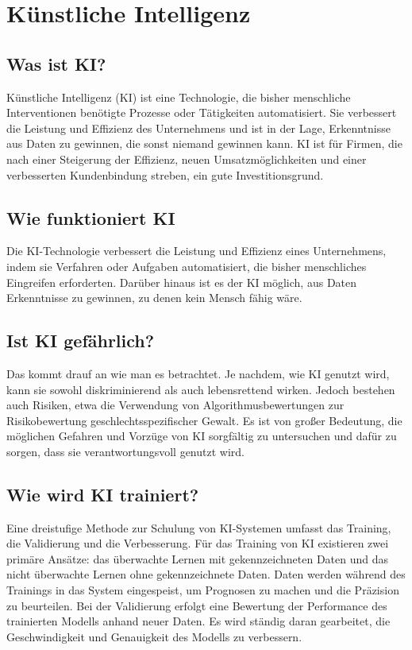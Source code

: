
\newpage
\chapter{Künstliche Intelligenz}
\section{Was ist KI?}
Künstliche Intelligenz (KI) ist eine Technologie, die bisher menschliche 
Interventionen benötigte Prozesse oder Tätigkeiten automatisiert. 
Sie verbessert die Leistung und Effizienz des Unternehmens und ist in der Lage, 
Erkenntnisse aus Daten zu gewinnen, die sonst niemand gewinnen kann.
KI ist für Firmen, die nach einer Steigerung der Effizienz, 
neuen Umsatzmöglichkeiten und einer verbesserten Kundenbindung streben,
ein gute Investitionsgrund.

\section{Wie funktioniert KI}
Die KI-Technologie verbessert die Leistung und Effizienz eines Unternehmens,
indem sie Verfahren oder Aufgaben automatisiert, die bisher menschliches Eingreifen
erforderten. Darüber hinaus ist es der KI möglich, aus Daten Erkenntnisse zu gewinnen,
zu denen kein Mensch fähig wäre.

\section{Ist KI gefährlich?}
Das kommt drauf an wie man es betrachtet. Je nachdem, wie KI genutzt wird,
kann sie sowohl diskriminierend als auch lebensrettend wirken. 
Jedoch bestehen auch Risiken, etwa die Verwendung von Algorithmusbewertungen 
zur Risikobewertung geschlechtsspezifischer Gewalt. Es ist von großer 
Bedeutung, die möglichen Gefahren und Vorzüge von KI sorgfältig zu untersuchen 
und dafür zu sorgen, dass sie verantwortungsvoll genutzt wird.

\section{Wie wird KI trainiert?}
Eine dreistufige Methode zur Schulung von KI-Systemen umfasst das Training,
die Validierung und die Verbesserung. Für das Training von KI existieren zwei
primäre Ansätze: das überwachte Lernen mit gekennzeichneten Daten und das nicht 
überwachte Lernen ohne gekennzeichnete Daten. Daten werden während des Trainings 
in das System eingespeist, um Prognosen zu machen und die Präzision zu beurteilen. 
Bei der Validierung erfolgt eine Bewertung der Performance des trainierten Modells 
anhand neuer Daten. Es wird ständig daran gearbeitet, die Geschwindigkeit und Genauigkeit 
des Modells zu verbessern.


